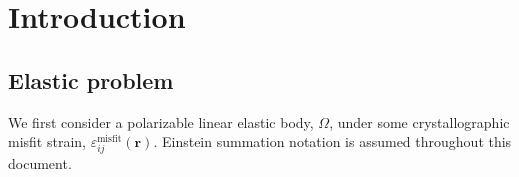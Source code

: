\documentclass[16pt]{article} %
\begin{document}
%
%
%


\tableofcontents %

\newpage %


\section{Introduction}

\subsection{Elastic problem}

%
We first consider a polarizable linear elastic body, $\Omega$, under some crystallographic misfit strain, $\varepsilon_{ij}^\mathrm{misfit} (\textbf{r})$.
%
Einstein summation notation is assumed throughout this document.
\end{document}
